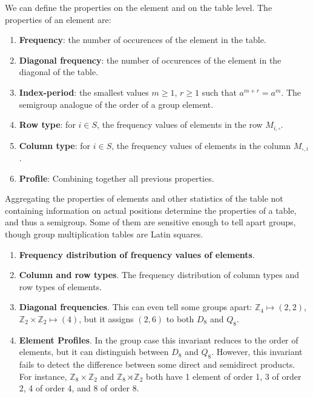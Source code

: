 \documentclass{amsart}
\newcommand{\Z}{\mathbb{Z}}
\theoremstyle{plain}
\theoremstyle{definition}
\begin{document}
We can define the properties on the element and on the table level. The properties of an element are:

\begin{enumerate}
\item\textbf{Frequency}: the number of occurences of the element in the table.
\item \textbf{Diagonal frequency}: the number of occurences of the element in the diagonal of the table.
\item \textbf{Index-period}: the smallest values $m\geq 1$, $r\geq 1$ such that $a^{m+r}=a^m$. The semigroup analogue of the order of a group element.
\item \textbf{Row type}: for $i\in S$, the frequency values of elements in the row $M_{i,\square}$.
\item \textbf{Column type}:  for $i\in S$, the frequency values of elements in the column $M_{\square,i}$.
\item \textbf{Profile}: Combining together all previous properties.
\end{enumerate} 

Aggregating the properties of elements and other statistics of the table not containing information on actual positions determine the properties of a table, and thus a semigroup. Some of them are sensitive enough to tell apart groups, though group multiplication tables are Latin squares.
\begin{enumerate}
\item\textbf{Frequency distribution of frequency values of elements}. %
\item\textbf{Column and row types}. The frequency distribution of column types and row types of elements. %
\item \textbf{Diagonal frequencies}. This can even tell some groups apart: $\Z_4\mapsto (2,2)$, $\Z_2\times \Z_2\mapsto (4)$, but it assigns $(2,6)$ to both $D_8$ and $Q_8$.
\item \textbf{Element Profiles}. In the group case this invariant reduces to the order of elements, but it can distinguish between $D_8$ and $Q_8$. However, this invariant fails to detect the difference between some direct and semidirect products. For instance, $\Z_8\times \Z_2$ and $\Z_8\rtimes \Z_2$ both have 1 element of order 1, 3 of order 2, 4 of order 4, and 8 of order 8.
\end{enumerate} 
\end{document}
